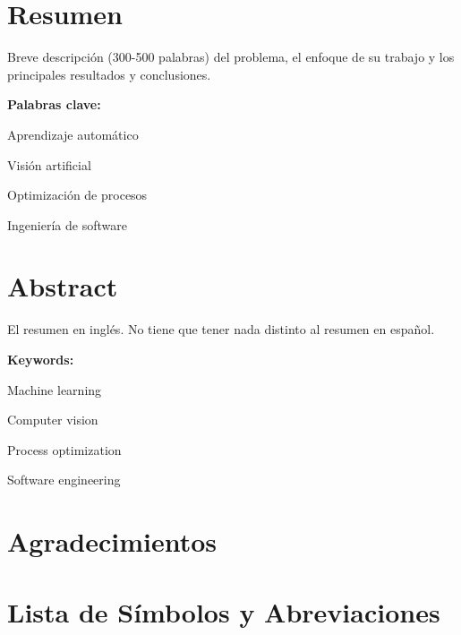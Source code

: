 \documentclass[12pt,a4paper]{report}
\begin{document}
\chapter*{Resumen}
Breve descripción (300-500 palabras) del problema, el enfoque de su trabajo y los principales resultados y conclusiones.

\vspace{2cm} %
\noindent\textbf{Palabras clave:} 
\begin{itemize*}[label={}, afterlabel={}, itemjoin={; }]
    \item Aprendizaje automático
    \item Visión artificial
    \item Optimización de procesos
    \item Ingeniería de software
\end{itemize*}
\newpage

\chapter*{Abstract}
El resumen en inglés. No tiene que tener nada distinto al resumen en español.

\vspace{2cm}
\noindent\textbf{Keywords:} 
\begin{itemize*}[label={}, afterlabel={}, itemjoin={; }]
    \item Machine learning
    \item Computer vision
    \item Process optimization
    \item Software engineering
\end{itemize*}
\newpage

\chapter*{Agradecimientos}
\newpage

\newpage
\tableofcontents %
\newpage
\listoftables
\newpage
\listoffigures

\newpage
\chapter*{Lista de Símbolos y Abreviaciones}
\end{document}
